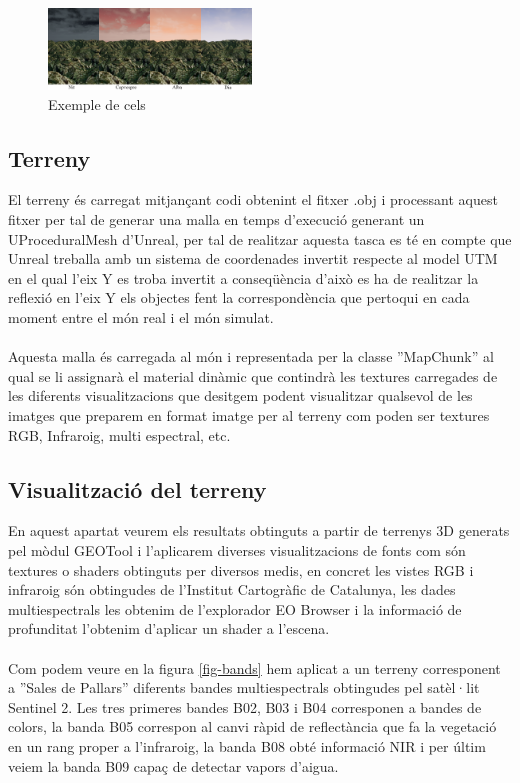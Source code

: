\documentclass[10pt,a4paper,twocolumn,twoside]{article}
\begin{document}
\begin{figure}[!h]
\centering
  	\includegraphics[width=0.48\textwidth]{sky/sky}
	\caption{Exemple de cels}
	\label{fig-sky}
\end{figure}

\subsection{Terreny}
El terreny és carregat mitjançant codi obtenint el fitxer .obj i processant aquest fitxer per tal de generar una malla en temps d'execució generant un UProceduralMesh\cite{uprocedural} d'Unreal, per tal de realitzar aquesta tasca es té en compte que Unreal treballa amb un sistema de coordenades invertit respecte al model UTM en el qual l'eix Y es troba invertit a conseqüència d'això es ha de realitzar la reflexió en l'eix Y els objectes fent la correspondència que pertoqui en cada moment entre el món real i el món simulat.
\\
\\
Aquesta malla és carregada al món i representada per la classe ''MapChunk'' al qual se li assignarà el material dinàmic que contindrà les textures carregades de les diferents visualitzacions que desitgem podent visualitzar qualsevol de les imatges que preparem en format imatge per al terreny com poden ser textures RGB, Infraroig, multi espectral, etc.

\subsection{Visualització del terreny}
En aquest apartat veurem els resultats obtinguts a partir de terrenys 3D generats pel mòdul GEOTool i l'aplicarem diverses visualitzacions de fonts com són textures o shaders obtinguts per diversos medis, en concret les vistes RGB i infraroig són obtingudes de l'Institut Cartogràfic de Catalunya, les dades multiespectrals les obtenim de l'explorador EO Browser\cite{eobrowser} i la informació de profunditat l'obtenim d'aplicar un shader a l'escena.
\\
\\
Com podem veure en la figura \ref{fig-bands} hem aplicat a un terreny corresponent a ''Sales de Pallars'' diferents bandes multiespectrals obtingudes pel satèl·lit Sentinel 2\cite{sentinel2}. Les tres primeres bandes B02, B03 i B04 corresponen a bandes de colors, la banda B05 correspon al canvi ràpid de reflectància que fa la vegetació en un rang proper a l'infraroig, la banda B08 obté informació NIR\cite{nir} i per últim veiem la banda B09 capaç de detectar vapors d'aigua.
\end{document}
